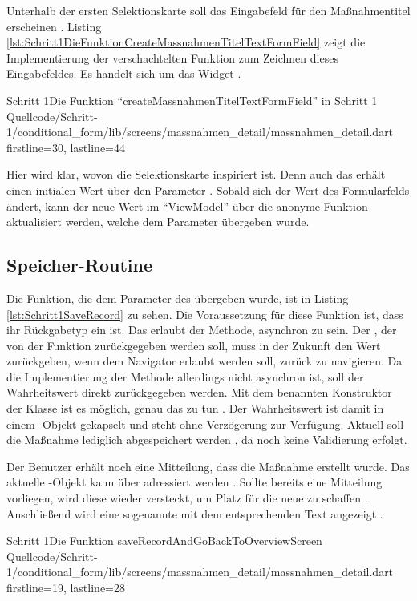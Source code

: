 Unterhalb der ersten Selektionskarte soll das Eingabefeld für den Maßnahmentitel erscheinen .
Listing \ref{lst:Schritt1DieFunktionCreateMassnahmenTitelTextFormField} zeigt die Implementierung der verschachtelten Funktion zum Zeichnen dieses Eingabefeldes.
 Es handelt sich um das Widget  .


\begin{alexlisting}{Schritt 1}{Die Funktion \enquote{createMassnahmenTitelTextFormField} in Schritt 1}
  {Quellcode/Schritt-1/conditional_form/lib/screens/massnahmen_detail/massnahmen_detail.dart}
  {firstline=30, lastline=44}
  \label{lst:Schritt1DieFunktionCreateMassnahmenTitelTextFormField}
\end{alexlisting}

Hier wird klar, wovon die Selektionskarte inspiriert ist.
Denn auch das  erhält einen initialen Wert über den Parameter .
Sobald sich der Wert des Formularfelds ändert, kann der neue Wert im \enquote{ViewModel} über die anonyme Funktion aktualisiert werden, welche dem Parameter  übergeben wurde.


\subsection{Speicher-Routine}


Die Funktion, die dem Parameter  des  übergeben wurde, ist in Listing \ref{lst:Schritt1SaveRecord} zu sehen.
Die Voraussetzung für diese Funktion ist, dass ihr Rückgabetyp ein  ist.
Das erlaubt der Methode, asynchron zu sein.
Der , der von der Funktion zurückgegeben werden soll, muss in der Zukunft den Wert  zurückgeben, wenn dem Navigator erlaubt  werden soll, zurück zu navigieren.
Da die Implementierung der Methode allerdings nicht asynchron ist, soll der Wahrheitswert direkt zurückgegeben werden.
Mit dem benannten Konstruktor  der Klasse  ist es möglich, genau das zu tun .
 Der Wahrheitswert ist damit in einem -Objekt gekapselt und steht ohne Verzögerung zur Verfügung.
Aktuell soll die Maßnahme lediglich abgespeichert werden , da noch keine Validierung erfolgt.

Der Benutzer erhält noch eine Mitteilung, dass die Maßnahme erstellt wurde.
Das aktuelle -Objekt kann über  adressiert werden . Sollte bereits eine Mitteilung vorliegen, wird diese wieder versteckt, um Platz für die neue zu schaffen . Anschließend wird eine sogenannte  mit dem entsprechenden Text angezeigt .

\begin{alexlisting}{Schritt 1}{Die Funktion saveRecordAndGoBackToOverviewScreen}
  {Quellcode/Schritt-1/conditional_form/lib/screens/massnahmen_detail/massnahmen_detail.dart}
  {firstline=19, lastline=28}
  \label{lst:Schritt1SaveRecord}
\end{alexlisting}


